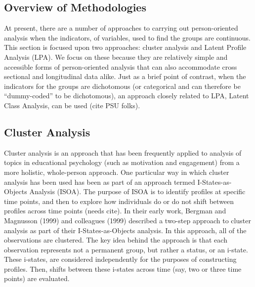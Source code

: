 \documentclass[man]{apa6}
\begin{document}
\subsection{Overview of Methodologies}\label{overview-of-methodologies}

At present, there are a number of approaches to carrying out
person-oriented analysis when the indicators, of variables, used to find
the groups are continuous. This section is focused upon two approaches:
cluster analysis and Latent Profile Analysis (LPA). We focus on these
because they are relatively simple and accessible forms of
person-oriented analysis that can also accommodate cross sectional and
longitudinal data alike. Just as a brief point of contrast, when the
indicators for the groups are dichotomous (or categorical and can
therefore be \enquote{dummy-coded} to be dichotomous), an approach
closely related to LPA, Latent Class Analysis, can be used (cite PSU
folks).

\subsection{Cluster Analysis}\label{cluster-analysis}

Cluster analysis is an approach that has been frequently applied to
analysis of topics in educational psychology (such as motivation and
engagement) from a more holistic, whole-person approach. One particular
way in which cluster analysis has been used has been as part of an
approach termed I-States-as-Objects Analysis (ISOA). The purpose of ISOA
is to identify profiles at specific time points, and then to explore how
individuals do or do not shift between profiles across time points
(needs cite). In their early work, Bergman and Magnusson (1999) and
colleagues (1999) described a two-step approach to cluster analysis as
part of their I-States-as-Objects analysis. In this approach, all of the
observations are clustered. The key idea behind the approach is that
each observation represents not a permanent group, but rather a status,
or an i-state. These i-states, are considered independently for the
purposes of constructing profiles. Then, shifts between these i-states
across time (say, two or three time points) are evaluated.
\end{document}
